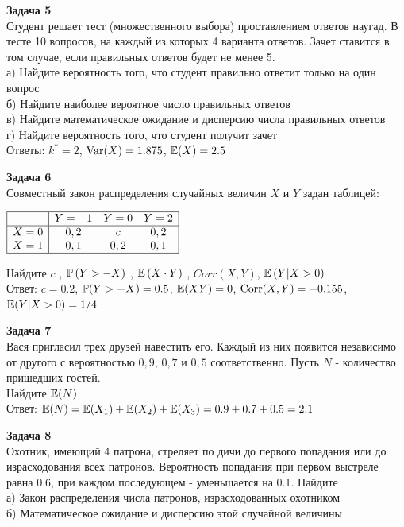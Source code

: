 \documentclass[12pt, a4paper]{article}\usepackage[]{graphicx}\usepackage[]{color}
\begin{document}
	\textbf{Задача 5} \\ %
	Студент решает тест (множественного выбора) проставлением
	ответов наугад. В тесте 10 вопросов, на каждый из которых 4
	варианта ответов. Зачет ставится в том случае, если правильных
	ответов будет не менее 5. \\
	а) Найдите вероятность того, что студент правильно ответит только
	на один вопрос \\
	б) Найдите наиболее вероятное число правильных ответов \\
	в) Найдите математическое ожидание и дисперсию числа правильных
	ответов \\
	г) Найдите вероятность того, что студент получит зачет \\

	Ответы: $k^*=2$, $\Var(X)=1.875$, $\E(X)=2.5$

	\textbf{Задача 6} \\ %
	Совместный закон распределения случайных величин  $X$  и  $Y$
	задан таблицей:

	$\begin{array}{|c|ccc|}
	\hline
	{} & {Y=-1} & {Y=0} & {Y=2}\\
	\hline
	{X=0} & {0,2} & {c} & {0,2}\\
	{X=1} & {0,1} & {0,2} & {0,1} \\
	\hline
	\end{array}$

	Найдите  $c$ ,  $\P\left(Y>-X\right)$ ,  $\E\left(X\cdot Y
	\right)$ , $Corr(X,Y)$, $\E\left(Y|X>0\right)$ \\

	Ответ: $c=0.2$, $\P(Y>-X)=0.5$, $\E(XY)=0$, $\Corr(X,Y)=-0.155$, $\E(Y|X>0)=1/4$

	\textbf{Задача 7} \\ %
	Вася пригласил трех друзей навестить его. Каждый из них появится
	независимо от другого с вероятностью $0,9$, $0,7$ и $0,5$
	соответственно. Пусть $N$ - количество пришедших гостей. \\
	Найдите $\E(N)$ \\

	Ответ: $\E(N)=\E(X_1)+\E(X_2)+\E(X_3)=0.9+0.7+0.5=2.1$

	\textbf{Задача 8} \\ %
	Охотник, имеющий 4 патрона, стреляет по дичи до первого
	попадания или до израсходования всех патронов. Вероятность
	попадания при первом выстреле равна 0.6, при каждом последующем -
	уменьшается на 0.1. Найдите \\
	а) Закон распределения числа патронов, израсходованных охотником \\
	б) Математическое ожидание и дисперсию этой случайной величины \\
\end{document}
